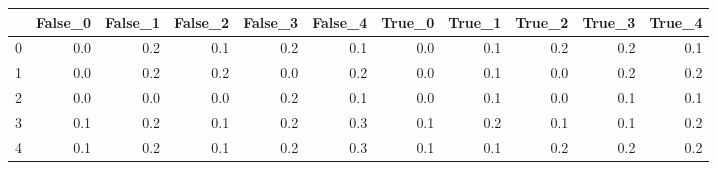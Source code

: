 \begin{tabular}{lrrrrrrrrrr}
\toprule
{} &  False\_0 &  False\_1 &  False\_2 &  False\_3 &  False\_4 &  True\_0 &  True\_1 &  True\_2 &  True\_3 &  True\_4 \\ \hline
\midrule
0 &      0.0 &      0.2 &      0.1 &      0.2 &      0.1 &     0.0 &     0.1 &     0.2 &     0.2 &     0.1 \\ \hline
1 &      0.0 &      0.2 &      0.2 &      0.0 &      0.2 &     0.0 &     0.1 &     0.0 &     0.2 &     0.2 \\ \hline
2 &      0.0 &      0.0 &      0.0 &      0.2 &      0.1 &     0.0 &     0.1 &     0.0 &     0.1 &     0.1 \\ \hline
3 &      0.1 &      0.2 &      0.1 &      0.2 &      0.3 &     0.1 &     0.2 &     0.1 &     0.1 &     0.2 \\ \hline
4 &      0.1 &      0.2 &      0.1 &      0.2 &      0.3 &     0.1 &     0.1 &     0.2 &     0.2 &     0.2 \\ \hline
\bottomrule
\end{tabular}
